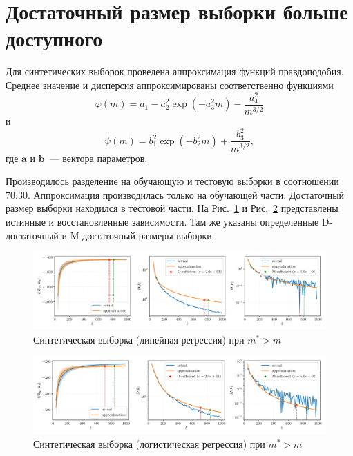 \section{Достаточный размер выборки больше доступного}

Для синтетических выборок проведена аппроксимация функций правдоподобия. Среднее значение и дисперсия аппроксимированы соответственно функциями
\[ \varphi(m) = a_1 - a_2^2 \exp\left( - a_3^2 m \right) - \dfrac{a_4^2}{m^{3/2}} \]
и
\[ \psi(m) = b_1^2 \exp\left( - b_2^2 m \right) + \dfrac{b_3^2}{m^{3/2}}, \]
где $\mathbf{a}$ и $\mathbf{b}$~--- вектора параметров.

Производилось разделение на обучающую и тестовую выборки в соотношении 70:30. Аппроксимация производилась только на обучающей части. Достаточный размер выборки находился в тестовой части. На Рис.~\ref{synthetic-regression-approximation} и Рис.~\ref{synthetic-classification-approximation} представлены истинные и восстановленные зависимости. Там же указаны определенные D-достаточный и M-достаточный размеры выборки.

\begin{figure}[h!]
    \centering
    \includegraphics[width=\textwidth]{paper/figures/synthetic-regression-approximation.pdf}
    \caption{Синтетическая выборка (линейная регрессия) при $m^* > m$}
    \label{synthetic-regression-approximation}
\end{figure}

\begin{figure}[h!]
    \centering
    \includegraphics[width=\textwidth]{paper/figures/synthetic-classification-approximation.pdf}
    \caption{Синтетическая выборка (логистическая регрессия) при $m^* > m$}
    \label{synthetic-classification-approximation}
\end{figure}